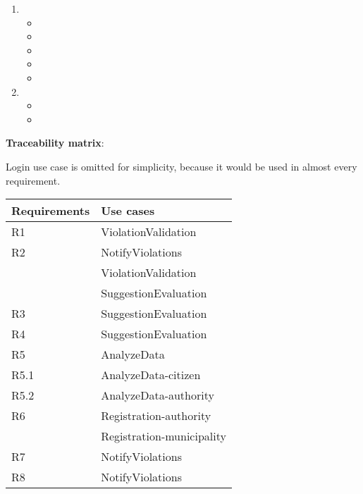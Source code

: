 \begin{enumerate}[label={}]
	\item {}
	\begin{itemize}[label={}]
		\item {}
		\item {}
		\item {}
		\item {}
		\item {}
	\end{itemize}
	\item {}
	\begin{itemize}[label={}]
		\item {}
		\item {}
	\end{itemize} 
\end{enumerate}

\bigskip
\textbf{Traceability matrix}:

Login use case is omitted for simplicity, because it would be used in almost every requirement.


\begin{tabular}{|l|>{\raggedright\arraybackslash}p{8cm}|}
	\hline 
	Requirements & Use cases \\ 
	\hline 
	R1 & ViolationValidation \\ 
	\hline 
	R2 & NotifyViolations \\ 
	   & ViolationValidation \\
	   & SuggestionEvaluation \\
	\hline 
	R3 & SuggestionEvaluation \\ 
	\hline 
	R4 & SuggestionEvaluation \\ 
	\hline 
	R5 & AnalyzeData \\ 
	\hline 
	R5.1& AnalyzeData-citizen \\ 
	\hline 
	R5.2& AnalyzeData-authority \\ 
	\hline 
	R6 & Registration-authority \\ 
	   & Registration-municipality \\
	\hline 
	R7 & NotifyViolations \\ 
	\hline 
	R8 & NotifyViolations \\ 
	\hline 
\end{tabular} 
